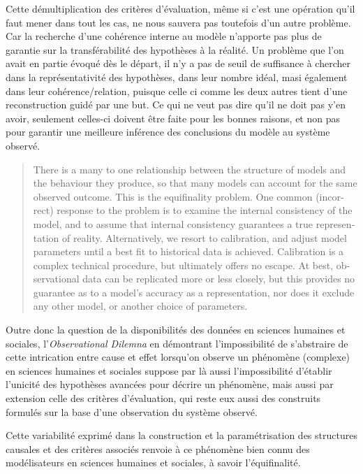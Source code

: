 Cette démultiplication des critères d'évaluation, même si c'est une opération qu'il faut mener dans tout les cas, ne nous sauvera pas toutefois d'un autre problème. Car la recherche d'une cohérence interne au modèle n'apporte pas plus de garantie sur la transférabilité des hypothèses à la réalité. Un problème que l'on avait en partie évoqué dès le départ, il n'y a pas de seuil de suffisance à chercher dans la représentativité des hypothèses, dans leur nombre idéal, masi également dans leur cohérence/relation, puisque celle ci comme les deux autres tient d'une reconstruction guidé par une but. Ce qui ne veut pas dire qu'il ne doit pas y'en avoir, seulement celles-ci doivent être faite pour les bonnes raisons, et non pas pour garantir une meilleure inférence des conclusions du modèle au système observé. %

\foreignblockquote{english}[\cite{Osullivan2004}]{There is a many to one relationship between the structure of models and the behaviour they produce, so that many models can account for the same observed outcome. This is the equifinality problem. One common (incorrect) response to the problem is to examine the internal consistency of the model, and to assume that internal consistency guarantees a true representation of reality. Alternatively, we resort to calibration, and adjust model parameters until a best fit to historical data is achieved. Calibration is a complex technical procedure, but ultimately offers no escape. At best, observational data can be replicated more or less closely, but this provides no guarantee as to a model’s accuracy as a representation, nor does it exclude any other model, or another choice of parameters.}

Outre donc la question de la disponibilités des données en sciences humaines et sociales, l'\textit{Observational Dilemna} en démontrant l'impossibilité de s'abstraire de cette intrication entre cause et effet lorsqu'on observe un phénomène (complexe) en sciences humaines et sociales suppose par là aussi l'impossibilité d'établir l'unicité des hypothèses avancées pour décrire un phénomène, mais aussi par extension celle des critères d'évaluation, qui reste eux aussi des construits formulés sur la base d'une observation du système observé.

Cette variabilité exprimé dans la construction et la paramétrisation des structures causales et des critères associés renvoie à ce phénomène bien connu des modélisateurs en sciences humaines et sociales, à savoir l'équifinalité.






















